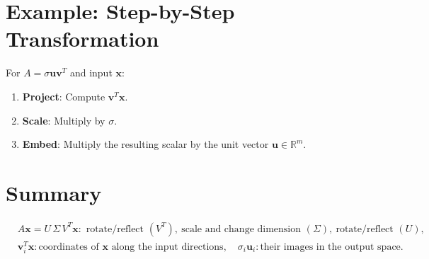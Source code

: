 \begin{notechapter}
\section{Example: Step-by-Step Transformation}
For \( A = \sigma \mathbf{u} \mathbf{v}^T \) and input \( \mathbf{x} \):
\begin{enumerate}
    \item \textbf{Project}: Compute \( \mathbf{v}^T \mathbf{x} \).
    \item \textbf{Scale}: Multiply by \( \sigma \).
        \item \textbf{Embed}: Multiply the resulting scalar by the unit vector \( \mathbf{u} \in \mathbb{R}^m \).
\end{enumerate}

\section{Summary}
\[
\boxed{
\begin{aligned}
&A\mathbf{x} = U\,\Sigma\,V^T\mathbf{x}: \text{ rotate/reflect } (V^T),\ \text{scale and change dimension } (\Sigma),\ \text{rotate/reflect } (U), \\
&\mathbf{v}_i^T\mathbf{x}: \text{coordinates of } \mathbf{x} \text{ along the input directions},\quad \sigma_i\mathbf{u}_i: \text{their images in the output space}.
\end{aligned}
}
\]
\end{notechapter}
